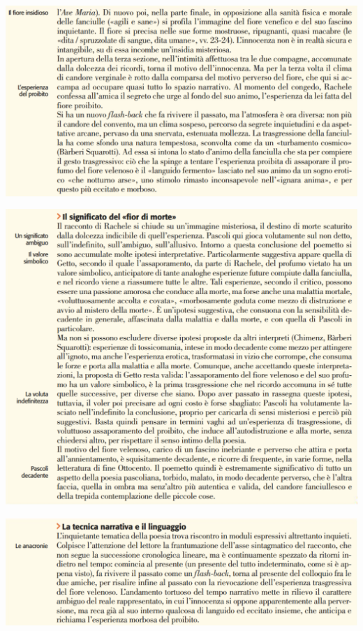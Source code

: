 \documentclass[a4paper, twoside, titlepage]{book}
\begin{document}
\begin{center}
\includegraphics[width=\textwidth]{digitale3}
\end{center}
\vfill
\begin{center}
\includegraphics[width=\textwidth]{digitale4}
\end{center}

\begin{center}
\includegraphics[width=\textwidth]{digitale5}
\end{center}
\end{document}
